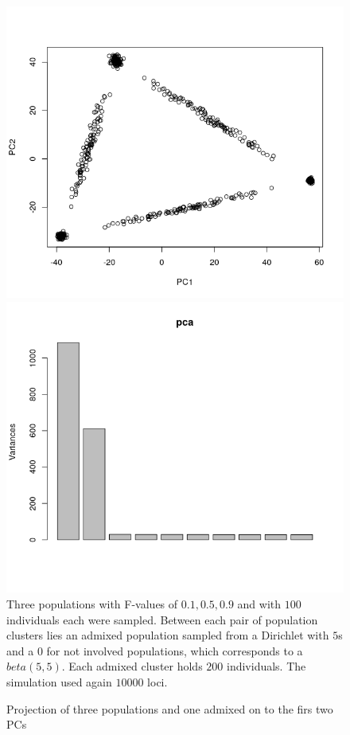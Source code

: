\documentclass[a4paper, 11pt]{article}
\begin{document}
\begin{figure}[h!]
\caption{Projection of three populations and one admixed on to the firs two PCs}
\includegraphics[scale=0.5]{Rplot_admixed_simplex}
\includegraphics[scale=0.5]{Rplot_eigenvalues_simplex}
Three populations with F-values  of $0.1, 0.5, 0.9$ and with $100$ individuals each were sampled. Between each pair of population clusters lies an admixed population sampled from a Dirichlet with $5$s and a $0$ for not involved populations, which corresponds to a $beta(5, 5)$. Each admixed cluster holds $200$ individuals. The simulation used again $10000$ loci.

\centering
\end{figure}
\end{document}
